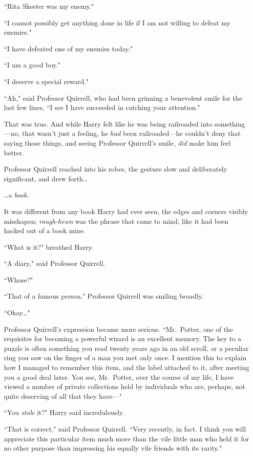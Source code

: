 ``Rita Skeeter was my enemy."

``I cannot possibly get anything done in life if I am not willing to defeat my enemies."

``I have defeated one of my enemies today."

``I am a good boy."

``I deserve a special reward."

``Ah," said Professor Quirrell, who had been grinning a benevolent smile for the last few lines, ``I see I have succeeded in catching your attention."

That was true. And while Harry felt like he was being railroaded into something—no, that wasn't just a feeling, he \emph{had} been railroaded—he couldn't deny that saying those things, and seeing Professor Quirrell's smile, \emph{did} make him feel better.

Professor Quirrell reached into his robes, the gesture slow and deliberately significant, and drew forth{\ldots}

{\ldots}a \emph{book}.

It was different from any book Harry had ever seen, the edges and corners visibly misshapen; \emph{rough-hewn} was the phrase that came to mind, like it had been hacked out of a book mine.

``What is it?" breathed Harry.

``A diary," said Professor Quirrell.

``Whose?"

``That of a famous person." Professor Quirrell was smiling broadly.

``Okay{\ldots}"

Professor Quirrell's expression became more serious. ``Mr.~Potter, one of the requisites for becoming a powerful wizard is an excellent memory. The key to a puzzle is often something you read twenty years ago in an old scroll, or a peculiar ring you saw on the finger of a man you met only once. I mention this to explain how I managed to remember this item, and the label attached to it, after meeting you a good deal later. You see, Mr.~Potter, over the course of my life, I have viewed a number of private collections held by individuals who are, perhaps, not quite deserving of all that they have—"

``You \emph{stole} it?" Harry said incredulously.

``That is correct," said Professor Quirrell. ``Very recently, in fact. I think you will appreciate this particular item much more than the vile little man who held it for no other purpose than impressing his equally vile friends with its rarity."

